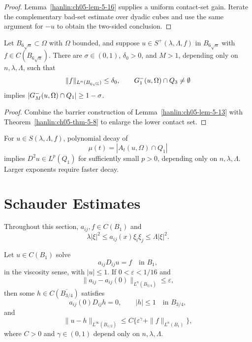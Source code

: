 \begin{proof}
\sketch Lemma~\ref{hanlin:ch05-lem-5-16} supplies a uniform contact-set
gain. Iterate the complementary bad-set estimate over dyadic cubes and use
the same argument for $-u$ to obtain the two-sided conclusion.
\end{proof}

\begin{lemma}\label{hanlin:ch05-lem-5-16}
Let $B_{6\sqrt n}\subset\Omega$ with $\Omega$ bounded, and suppose
$u\in S^+(\lambda,\Lambda,f)$ in $B_{6\sqrt n}$ with
$f\in C(B_{6\sqrt n})$. There are $\sigma\in(0,1)$, $\delta_0>0$,
and $M>1$, depending only on $n,\lambda,\Lambda$, such that
\[
\|f\|_{L^n(B_{6\sqrt n})}\leq\delta_0,\qquad
G^-_{1}(u,\Omega)\cap Q_3\neq\emptyset
\]
implies $|G^-_{M}(u,\Omega)\cap Q_1|\geq1-\sigma$.
\end{lemma}

\begin{proof}
\sketch Combine the barrier construction of
Lemma~\ref{hanlin:ch05-lem-5-13} with
Theorem~\ref{hanlin:ch05-thm-5-8} to enlarge the lower contact set.
\end{proof}


\begin{remark}\label{hanlin:ch05-rem-5-17}
For $u\in S(\lambda,\Lambda,f)$, polynomial decay of
\[
\mu(t)=|A_t(u,\Omega)\cap Q_1|
\]
implies $D^2u\in L^p(Q_1)$ for sufficiently small $p>0$, depending only
on $n,\lambda,\Lambda$. Larger exponents require faster decay.
\end{remark}

\section{Schauder Estimates}

Throughout this section, $a_{ij},f\in C(B_1)$ and
\[
\lambda|\xi|^2\leq a_{ij}(x)\xi_i\xi_j\leq\Lambda|\xi|^2.
\]

\begin{lemma}\label{hanlin:ch05-lem-5-18}
Let $u\in C(B_1)$ solve
\[
a_{ij}D_{ij}u=f\quad\text{in }B_1,
\]
in the viscosity sense, with $|u|\leq1$. If $0<\varepsilon<1/16$ and
\[
\|a_{ij}-a_{ij}(0)\|_{L^n(B_{3/4})}\leq\varepsilon,
\]
then some $h\in C(\overline{B_{3/4}})$ satisfies
\[
a_{ij}(0)D_{ij}h=0,\qquad |h|\leq1\quad\text{in }B_{3/4},
\]
and
\[
\|u-h\|_{L^\infty(B_{1/2})}\leq C\{\varepsilon^\gamma+\|f\|_{L^n(B_1)}\},
\]
where $C>0$ and $\gamma\in(0,1)$ depend only on $n,\lambda,\Lambda$.
\end{lemma}

